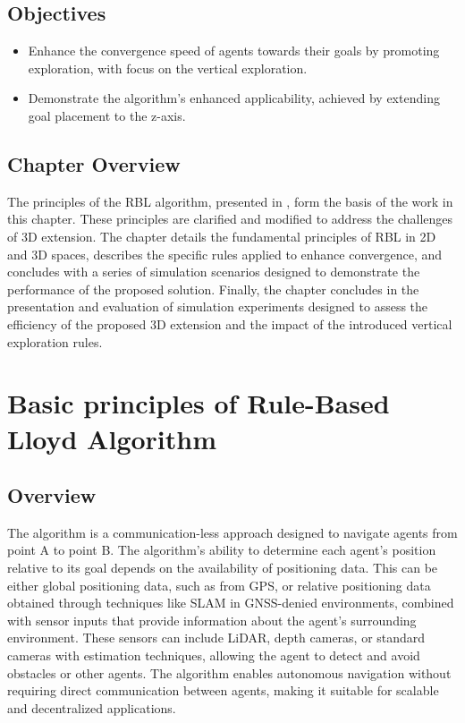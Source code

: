     \subsection{Objectives}
        \begin{itemize}
            \item   Enhance the convergence speed of agents towards their goals by promoting exploration, with  focus on the vertical exploration.
            \item   Demonstrate the algorithm's enhanced applicability, achieved by extending goal placement to the z-axis.
        \end{itemize}

    \subsection{Chapter Overview}
        The principles of the \ac{RBL} algorithm, presented in \cite{rbl_paper}, form the basis of the work in this chapter. 
        These principles are clarified and modified to address the challenges of \ac{3D} extension.  
        The chapter details the fundamental principles of RBL in \ac{2D} and \ac{3D} spaces, describes the specific rules applied to enhance convergence, and concludes with a series of simulation scenarios designed to demonstrate the performance of the proposed solution.
        Finally, the chapter concludes in the presentation and evaluation of simulation experiments designed to assess the efficiency of the proposed \ac{3D} extension and the impact of the introduced vertical exploration rules.

\section{Basic principles of Rule-Based Lloyd Algorithm}

    \subsection{Overview}        
        The algorithm is a communication-less approach designed to navigate agents from point A to point B. 
        The algorithm's ability to determine each agent's position relative to its goal depends on the availability of positioning data. 
        This can be either global positioning data, such as from GPS, or relative positioning data obtained through techniques like SLAM in GNSS-denied environments, combined with sensor inputs that provide information about the agent's surrounding environment.
        These sensors can include LiDAR, depth cameras, or standard cameras with estimation techniques, allowing the agent to detect and avoid obstacles or other agents. 
        The algorithm enables autonomous navigation without requiring direct communication between agents, making it suitable for scalable and decentralized applications.


